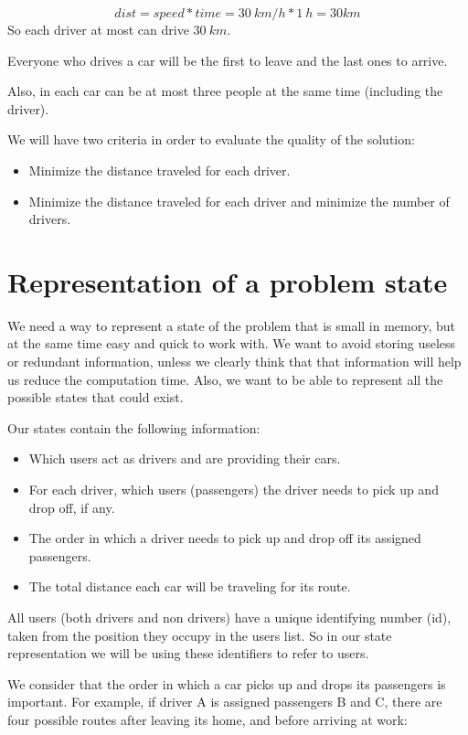 \documentclass[12]{article}
\begin{document}
$$ dist = speed * time = 30\ km/h * 1\ h = 30 km $$
So each driver at most can drive $30\ km$.

Everyone who drives a car will be the first to leave and the last ones to arrive.

Also, in each car can be at most three people at the same time (including the driver).

We will have two criteria in order to evaluate the quality of the solution:
\begin{itemize}
  \item Minimize the distance traveled for each driver.
  \item Minimize the distance traveled for each driver and minimize the number of drivers.
\end{itemize} 
 
\section{Representation of a problem state}
We need a way to represent a state of the problem that is small in memory, but at the same time easy and quick to work with.
We want to avoid storing useless or redundant information, unless we clearly think that that information will help us reduce the computation time. Also, we want to be able to represent all the possible states that could exist.

Our states contain the following information:

\begin{itemize}
	\item Which users act as drivers and are providing their cars.
	\item For each driver, which users (passengers) the driver needs to pick up and drop off, if any.
	\item The order in which a driver needs to pick up and drop off its assigned passengers.
	\item The total distance each car will be traveling for its route.
\end{itemize}

All users (both drivers and non drivers) have a unique identifying number (id), taken from the position they occupy in the users list.
So in our state representation we will be using these identifiers to refer to users.

We consider that the order in which a car picks up and drops its passengers is important. For example, if driver A is assigned passengers B and C, there are four possible routes after leaving its home, and before arriving at work:
\end{document}
